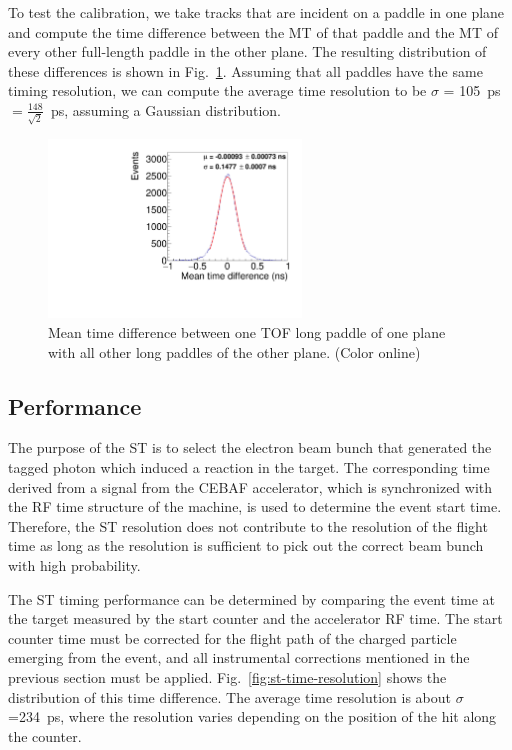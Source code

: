 To test the calibration, we take tracks that are incident on a paddle in one plane and compute the time difference between the MT of that paddle and the MT of every other full-length paddle in the other plane. The resulting distribution of these differences is shown in Fig.~\ref{fig:mt_diff}. Assuming that all paddles have the same timing resolution, we can compute the
average time resolution to be $\sigma$ = 105~ps$=\frac{148}{\sqrt{2}}$~ps, assuming a Gaussian distribution.
\begin{figure}[tbp]
\begin{center}
\includegraphics[width=0.6\textwidth]{figures/mt_diff_fullTOF.pdf}
\caption{\label{fig:mt_diff} Mean time difference between one TOF long paddle of one plane with all other long paddles
of the other plane. (Color online)}
\end{center}
\end{figure}

\subsection{Performance \label{sec:scperformance}}
The purpose of the ST is to select the electron beam bunch that generated the tagged photon which induced a reaction in the target. The corresponding time derived from a signal from the CEBAF accelerator, which is synchronized with the RF time structure of the machine, is used to determine the event start time. Therefore, the ST resolution does not contribute to the resolution of the flight time as long as the resolution is sufficient to pick out the correct beam bunch with high probability.

The ST timing performance can be determined by comparing the event time at the target measured by the start counter and the accelerator RF time. The start counter time must be corrected for the flight path of the charged particle emerging from the event, and all instrumental corrections mentioned in the previous section must be applied. Fig.~\ref{fig:st-time-resolution} shows the distribution of this time difference. The average time resolution is about $\sigma$=234~ps, where the resolution varies depending on the position of the hit along the counter. 


